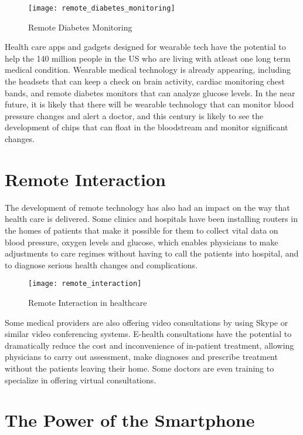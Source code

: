 \documentclass[12pt]{article}
\begin{document}
\begin{figure}[h]
\centering
\texttt{[image: remote\_diabetes\_monitoring]}
\caption{Remote Diabetes Monitoring}
\end{figure}

Health care apps and gadgets designed for wearable tech have the potential to help the 140 million people in the US who are living with atleast one long term medical condition. Wearable medical technology is already appearing, including the headsets that can keep a check on brain activity, cardiac monitoring chest bands, and remote diabetes monitors that can analyze glucose levels. In the near future, it is likely that there will be wearable technology that can monitor blood pressure changes and alert a doctor, and this century is likely to see the development of chips that can float in the bloodstream and monitor significant changes. 

\section{Remote Interaction}

The development of remote technology has also had an impact on the way that health care is delivered. Some clinics and hospitals have been installing routers in the homes of patients that make it possible for them to collect vital data on blood pressure, oxygen levels and glucose, which enables physicians to make adjustments to care regimes without having to call the patients into hospital, and to diagnose serious health changes and complications.

\begin{figure}[h]
\centering
\texttt{[image: remote\_interaction]}
\caption{Remote Interaction in healthcare}
\end{figure}

Some medical providers are also offering video consultations by using Skype or similar video conferencing systems. E-health consultations have the potential to dramatically reduce the cost and inconvenience  of in-patient treatment, allowing physicians to carry out assessment, make diagnoses and prescribe treatment without the patients leaving their home. Some doctors are even training to specialize in offering virtual consultations.

\section{The Power of the Smartphone}   
\end{document}
